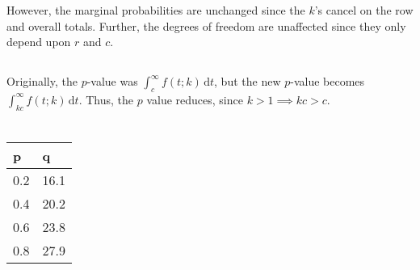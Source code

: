 \documentclass[twocolumn]{article}
\newcommand{\setsection}[1]{\setcounter{section}{#1}\addtocounter{section}{-1}\section{}}
\newcommand{\intg}[4]{\int_{#1}^{#2} \! #3 \, \mathrm{d}#4}
\begin{document}
However, the marginal probabilities are unchanged since the $k$'s cancel on the row and overall totals. Further, the degrees of freedom are unaffected since they only depend upon $r$ and $c$.

\subsection{}

Originally, the $p$-value was $\intg{c}{\infty}{f(t;k)}{t}$, but the new $p$-value becomes $\intg{kc}{\infty}{f(t;k)}{t}$. Thus, the $p$ value reduces, since $k>1\implies kc>c$.

\setsection{22}

\subsection{}

\begin{table}[h]
\begin{tabular}{@{}ll@{}}
\toprule
p   & q    \\ \midrule
0.2 & 16.1 \\
0.4 & 20.2 \\
0.6 & 23.8 \\
0.8 & 27.9 \\ \bottomrule
\end{tabular}
\end{table}

\setsection{25}

\setsection{29}
\end{document}
